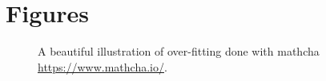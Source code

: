 

\chapter{Figures} \label{chap:fig}

\lipsum

\begin{figure}
    \centering
    \hfil
    \subfloat[$f_w$ is generalising.]{
    \label{of:yes}}
  \caption{A beautiful illustration of over-fitting done with mathcha \url{https://www.mathcha.io/}.}
  \label{fitting}
\end{figure}
